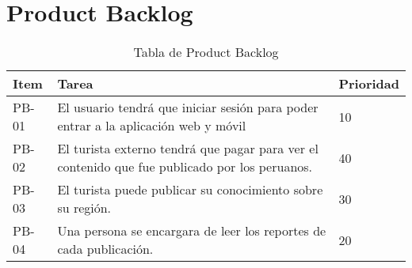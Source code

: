 \chapter{Product Backlog}
\begin{table}[htbp]
	\begin{center}
		\begin{tabular}{|l|p{5cm}|l|}
			\hline
			Item & Tarea & Prioridad \\
			\hline \hline
			PB-01 & El usuario tendrá que iniciar sesión para poder entrar a la aplicación web y móvil			
			& 10
			\\ \hline
			PB-02 & El turista externo tendrá que pagar para ver el contenido que fue publicado por los peruanos. & 40		
			\\ \hline
			PB-03 & El turista puede publicar su conocimiento sobre su región.			
			& 30
			\\ \hline
			PB-04 & Una persona se encargara de leer los reportes de cada publicación.						
			& 20
			\\ \hline
		\end{tabular}
		\caption {Tabla de Product Backlog}
	\end{center}
\end{table}